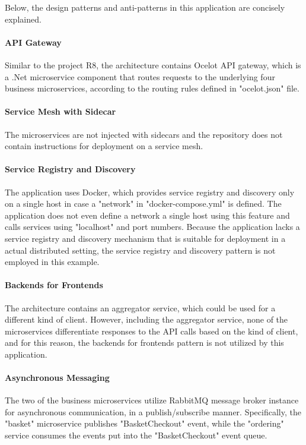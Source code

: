 \documentclass{Configuration_Files/PoliMi3i_thesis}
\begin{document}
Below, the design patterns and anti-patterns in this application are concisely explained.

\paragraph{API Gateway} Similar to the project R8, the architecture contains Ocelot API gateway, which is a .Net microservice component that routes requests to the underlying four business microservices, according to the routing rules defined in "ocelot.json" file.

\paragraph{Service Mesh with Sidecar} The microservices are not injected with sidecars and the repository does not contain instructions for deployment on a service mesh.

\paragraph{Service Registry and Discovery} The application uses Docker, which provides service registry and discovery only on a single host in case a "network" in "docker-compose.yml" is defined.
The application does not even define a network a single host using this feature and calls services using "localhost" and port numbers.
Because the application lacks a service registry and discovery mechanism that is suitable for deployment in a actual distributed setting, the service registry and discovery pattern is not employed in this example.

\paragraph{Backends for Frontends} The architecture contains an aggregator service, which could be used for a different kind of client.
However, including the aggregator service, none of the microservices differentiate responses to the API calls based on the kind of client, and for this reason, the backends for frontends pattern is not utilized by this application.

\paragraph{Asynchronous Messaging} The two of the business microservices utilize RabbitMQ message broker instance for asynchronous communication, in a publish/subscribe manner.
Specifically, the "basket" microservice publishes "BasketCheckout" event, while the "ordering" service consumes the events put into the "BasketCheckout" event queue.
\end{document}
